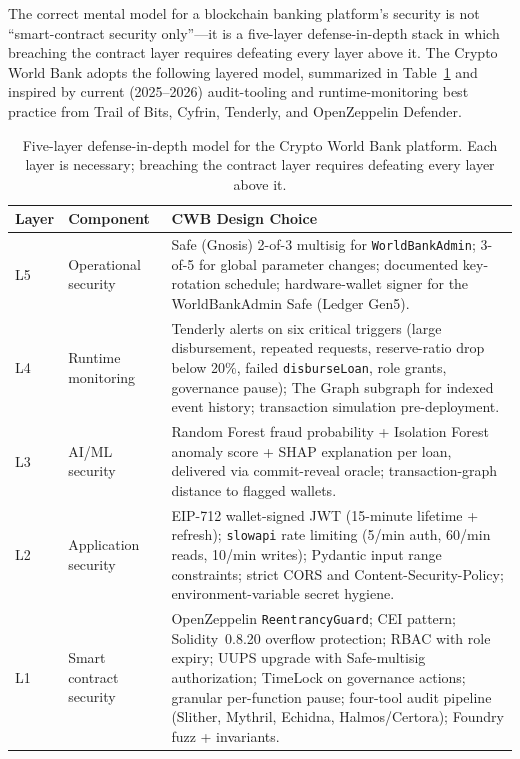 \documentclass[12pt,a4paper]{report}
\begin{document}
The correct mental model for a blockchain banking platform's security is not ``smart-contract security only''---it is a five-layer defense-in-depth stack in which breaching the contract layer requires defeating every layer above it. The Crypto World Bank adopts the following layered model, summarized in Table~\ref{tab:defense-layers} and inspired by current (2025--2026) audit-tooling and runtime-monitoring best practice from Trail of Bits, Cyfrin, Tenderly, and OpenZeppelin Defender.

\begin{table}[H]
\centering
\caption{Five-layer defense-in-depth model for the Crypto World Bank platform. Each layer is necessary; breaching the contract layer requires defeating every layer above it.}
\label{tab:defense-layers}
\begin{tabular}{p{1.4cm}p{4.0cm}p{8.5cm}}
\hline
\textbf{Layer} & \textbf{Component} & \textbf{CWB Design Choice} \\
\hline
L5 & Operational security & Safe (Gnosis) 2-of-3 multisig for \texttt{WorldBankAdmin}; 3-of-5 for global parameter changes; documented key-rotation schedule; hardware-wallet signer for the WorldBankAdmin Safe (Ledger Gen5). \\
\hline
L4 & Runtime monitoring & Tenderly alerts on six critical triggers (large disbursement, repeated requests, reserve-ratio drop below 20\%, failed \texttt{disburseLoan}, role grants, governance pause); The Graph subgraph for indexed event history; transaction simulation pre-deployment. \\
\hline
L3 & AI/ML security & Random Forest fraud probability + Isolation Forest anomaly score + SHAP explanation per loan, delivered via commit-reveal oracle; transaction-graph distance to flagged wallets. \\
\hline
L2 & Application security & EIP-712 wallet-signed JWT (15-minute lifetime + refresh); \texttt{slowapi} rate limiting (5/min auth, 60/min reads, 10/min writes); Pydantic input range constraints; strict CORS and Content-Security-Policy; environment-variable secret hygiene. \\
\hline
L1 & Smart contract security & OpenZeppelin \texttt{ReentrancyGuard}; CEI pattern; Solidity~0.8.20 overflow protection; RBAC with role expiry; UUPS upgrade with Safe-multisig authorization; TimeLock on governance actions; granular per-function pause; four-tool audit pipeline (Slither, Mythril, Echidna, Halmos/Certora); Foundry fuzz + invariants. \\
\hline
\end{tabular}
\end{table}
\end{document}

